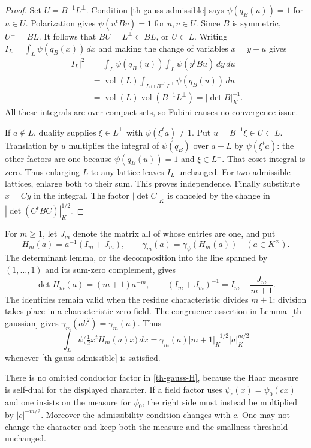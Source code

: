 \begin{proof}
Set $U=B^{-1}L^\perp$.  Condition \eqref{th-gauss-admissible} says
$\psi(q_B(u))=1$ for $u\in U$.  Polarization gives
$\psi(u^tBv)=1$ for $u,v\in U$.  Since $B$ is symmetric,
$U^\perp=BL$.  It follows that $BU=L^\perp\subset BL$, or $U\subset L$.
Writing $I_L=\int_L\psi(q_B(x))\,dx$ and making the change of variables
$x=y+u$ gives
\begin{align*}
 |I_L|^2
 &=\int_L\psi(q_B(u))
       \int_L\psi(y^tBu)\,dy\,du\\
 &=\operatorname{vol}(L)
       \int_{L\cap B^{-1}L^\perp}\psi(q_B(u))\,du\\
 &=\operatorname{vol}(L)\operatorname{vol}(B^{-1}L^\perp)
   =|\det B|_K^{-1}.
\end{align*}
All these integrals are over compact sets, so Fubini causes no
convergence issue.

If $a\notin L$, duality supplies $\xi\in L^\perp$ with
$\psi(\xi^ta)\ne1$.  Put $u=B^{-1}\xi\in U\subset L$.
Translation by $u$ multiplies the integral of $\psi(q_B)$ over $a+L$
by $\psi(\xi^ta)$: the other factors are one because
$\psi(q_B(u))=1$ and $\xi\in L^\perp$.  That coset integral is zero.
Thus enlarging $L$ to any lattice leaves $I_L$ unchanged.  For two
admissible lattices, enlarge both to their sum.  This proves independence.
Finally substitute $x=Cy$ in the integral.  The factor $|\det C|_K$
is canceled by the change in $|\det(C^tBC)|_K^{1/2}$.
\end{proof}

For $m\ge1$, let $J_m$ denote the matrix all of whose entries are one,
and put
\[
 H_m(a)=a^{-1}(I_m+J_m),\qquad
 \gamma_m(a)=\gamma_\psi(H_m(a))\quad(a\in K^\times).
\]
The determinant lemma, or the decomposition into the line spanned by
$(1,\ldots,1)$ and its sum-zero complement, gives
\begin{equation}\label{th-hessian-det}
 \det H_m(a)=(m+1)a^{-m},\qquad
 (I_m+J_m)^{-1}=I_m-\frac{J_m}{m+1}.
\end{equation}
The identities remain valid when the residue characteristic divides
$m+1$: division takes place in a characteristic-zero field.  The
congruence assertion in Lemma~\ref{th-gaussian} gives
$\gamma_m(ab^2)=\gamma_m(a)$.  Thus
\begin{equation}\label{th-gauss-H}
 \int_L\psi\bigl(\tfrac12x^tH_m(a)x\bigr)\,dx
 =\gamma_m(a)|m+1|_K^{-1/2}|a|_K^{m/2}
\end{equation}
whenever \eqref{th-gauss-admissible} is satisfied.

\begin{remark}\label{th-conductor}
There is no omitted conductor factor in \eqref{th-gauss-H}, because the
Haar measure is self-dual for the displayed character.  If a field factor
uses $\psi_c(x)=\psi_0(cx)$ and one insists on the measure for $\psi_0$,
the right side must instead be multiplied by $|c|^{-m/2}$.
Moreover the admissibility condition changes with $c$.  One may not
change the character and keep both the measure and the smallness
threshold unchanged.
\end{remark}

